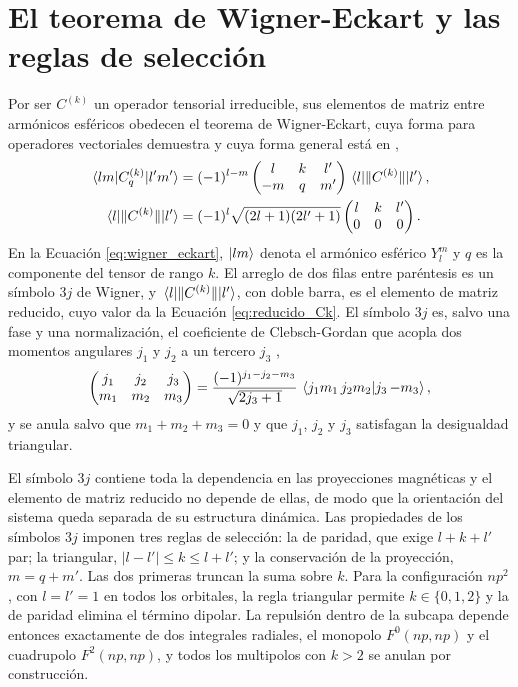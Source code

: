 \section{El teorema de Wigner-Eckart y las reglas de selección}
\label{sec:wigner_eckart}

Por ser $C^{(k)}$ un operador tensorial irreducible, sus elementos de matriz entre armónicos esféricos obedecen el teorema de Wigner-Eckart, cuya forma para operadores vectoriales demuestra \textcite[Complemento D\textsubscript{X}]{CohenTannoudji1977} y cuya forma general está en \textcite{Edmonds1957},
\begin{align}
  \mel{lm}{C_{q}^{(k)}}{l'm'} &= (-1)^{l-m} \begin{pmatrix} l & k & l' \\ -m & q & m' \end{pmatrix} \mel{l}{\|C^{(k)}\|}{l'}, \label{eq:wigner_eckart}\\
  \mel{l}{\|C^{(k)}\|}{l'} &= (-1)^l \sqrt{(2l+1)(2l'+1)} \begin{pmatrix} l & k & l' \\ 0 & 0 & 0 \end{pmatrix}. \label{eq:reducido_Ck}
\end{align}
En la Ecuación \eqref{eq:wigner_eckart}, $\ket{lm}$ denota el armónico esférico $Y_l^m$ y $q$ es la componente del tensor de rango $k$. El arreglo de dos filas entre paréntesis es un símbolo $3j$ de Wigner, y $\mel{l}{\|C^{(k)}\|}{l'}$, con doble barra, es el elemento de matriz reducido, cuyo valor da la Ecuación \eqref{eq:reducido_Ck}. El símbolo $3j$ es, salvo una fase y una normalización, el coeficiente de Clebsch-Gordan que acopla dos momentos angulares $j_1$ y $j_2$ a un tercero $j_3$ \parencite{Edmonds1957},
\begin{equation}
  \begin{pmatrix} j_1 & j_2 & j_3 \\ m_1 & m_2 & m_3 \end{pmatrix} = \frac{(-1)^{j_1 - j_2 - m_3}}{\sqrt{2j_3+1}}\, \braket{j_1 m_1\, j_2 m_2}{j_3\, {-m_3}},
\end{equation}
y se anula salvo que $m_1 + m_2 + m_3 = 0$ y que $j_1$, $j_2$ y $j_3$ satisfagan la desigualdad triangular.

El símbolo $3j$ contiene toda la dependencia en las proyecciones magnéticas y el elemento de matriz reducido no depende de ellas, de modo que la orientación del sistema queda separada de su estructura dinámica. Las propiedades de los símbolos $3j$ imponen tres reglas de selección: la de paridad, que exige $l + k + l'$ par; la triangular, $|l - l'| \le k \le l + l'$; y la conservación de la proyección, $m = q + m'$. Las dos primeras truncan la suma sobre $k$. Para la configuración $np^2$, con $l = l' = 1$ en todos los orbitales, la regla triangular permite $k \in \{0, 1, 2\}$ y la de paridad elimina el término dipolar. La repulsión dentro de la subcapa depende entonces exactamente de dos integrales radiales, el monopolo $F^0(np,np)$ y el cuadrupolo $F^2(np,np)$, y todos los multipolos con $k > 2$ se anulan por construcción.

